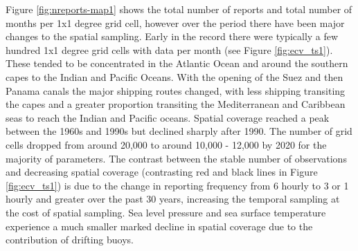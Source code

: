 Figure \ref{fig:nreports-map1} shows the total number of reports and total number of months per 1x1 degree grid cell, however over the period \datatimerange{} there have been major changes to the spatial sampling.
Early in the record there were typically a few hundred 1x1 degree grid cells with data per month (see Figure \ref{fig:ecv_ts1}).
These tended to be concentrated in the Atlantic Ocean and around the southern capes to the Indian and Pacific Oceans.
With the opening of the Suez and then Panama canals the major shipping routes changed, with less shipping transiting the capes and a greater proportion transiting the Mediterranean and Caribbean seas to reach the Indian and Pacific oceans.
Spatial coverage reached a peak between the 1960s and 1990s but declined sharply after 1990.
The number of grid cells dropped from around 20,000 to around 10,000 - 12,000 by 2020 for the majority of parameters. 
The contrast between the stable number of observations and decreasing spatial coverage (contrasting red and black lines in Figure \ref{fig:ecv_ts1}) is due to the change in reporting frequency from 6 hourly to 3 or 1 hourly and greater over the past 30 years, increasing the temporal sampling at the cost of spatial sampling.
Sea level pressure and sea surface temperature experience a much smaller marked decline in spatial coverage due to the contribution of drifting buoys.



